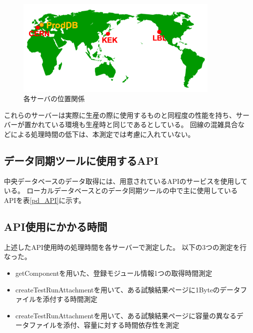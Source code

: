 \begin{figure}[bpt]\centering
\includegraphics[width=10cm]{server_geometry}
\caption[各サーバの位置関係]{各サーバの位置関係}
\label{server_geometry}
\end{figure}

これらのサーバーは実際に生産の際に使用するものと同程度の性能を持ち、サーバーが置かれている環境も生産時と同じであるとしている。
回線の混雑具合などによる処理時間の低下は、本測定では考慮に入れていない。

\subsection{データ同期ツールに使用するAPI}
中央データベースのデータ取得には、用意されているAPIのサービスを使用している。
ローカルデータベースとのデータ同期ツールの中で主に使用しているAPIを表\ref{pd_API}に示す。

\begin{table}[tbp]
  \begin{center}
  \caption[データ同期ツールの中で使用しているAPI]{データ同期ツールの中で使用したAPI}
  \label{pd_API}
  \end{center}
\end{table}

\subsection{API使用にかかる時間}
上述したAPI使用時の処理時間を各サーバーで測定した。
以下の3つの測定を行なった。
\begin{itemize}
  \item getComponentを用いた、登録モジュール情報1つの取得時間測定
  \item createTestRunAttachmentを用いて、ある試験結果ページに1Byteのデータファイルを添付する時間測定
  \item createTestRunAttachmentを用いて、ある試験結果ページに容量の異なるデータファイルを添付、容量に対する時間依存性を測定
\end{itemize}

